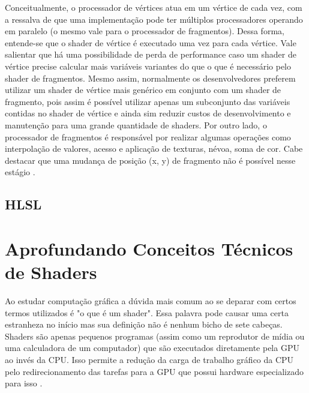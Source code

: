 Conceitualmente, o processador de vértices atua em um vértice de cada vez, com a ressalva de que uma implementação pode ter múltiplos processadores operando em paralelo (o mesmo vale para o processador de fragmentos). Dessa forma, entende-se que o shader de vértice é executado uma vez para cada vértice. Vale salientar que há uma possibilidade de perda de performance caso um shader de vértice precise calcular mais variáveis variantes do que o que é necessário pelo shader de fragmentos. Mesmo assim, normalmente os desenvolvedores preferem utilizar um shader de vértice mais genérico em conjunto com um shader de fragmento, pois assim é possível utilizar apenas um subconjunto das variáveis contidas no shader de vértice e ainda sim reduzir custos de desenvolvimento e manutenção para uma grande quantidade de shaders. Por outro lado, o processador de fragmentos é responsável por realizar algumas operações como interpolação de valores, acesso e aplicação de texturas, névoa, soma de cor. Cabe destacar que uma mudança de posição (x, y) de fragmento não é possível nesse estágio \cite{GLSLBook}.

\subsection{HLSL}
\label{sec:hlsl}


\section{Aprofundando Conceitos Técnicos de Shaders}
\label{sec:aprofundando-conceitos-tecnicos-shaders}

Ao estudar computação gráfica a dúvida mais comum ao se deparar com certos termos utilizados é "o que é um shader". Essa palavra pode causar uma certa estranheza no início mas sua definição não é nenhum bicho de sete cabeças. Shaders são apenas pequenos programas (assim como um reprodutor de mídia ou uma calculadora de um computador) que são executados diretamente pela \acrshort{GPU} ao invés da \acrshort{CPU}. Isso permite a redução da carga de trabalho gráfico da \acrshort{CPU} pelo redirecionamento das tarefas para a \acrshort{GPU} que possui hardware especializado para isso \cite{openGLBook}.

